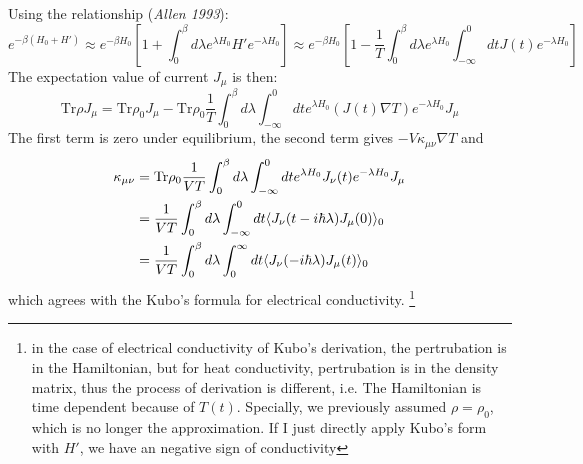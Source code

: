 \documentclass{article}
\begin{document}
Using the relationship (\emph{Allen 1993}):
\begin{equation}
    e^{-\beta (H_0 + H')} \approx e^{-\beta H_0} \left[ 1 + \int_0^{\beta} d\lambda e^{\lambda H_0} H' e^{-\lambda H_0} \right]
        \approx e^{-\beta H_0} \left[ 1 - \frac{1}{T} \int_0^{\beta} d\lambda e^{\lambda H_0} \int _{-\infty}^{0} dt J(t) e^{-\lambda H_0} \right]
\end{equation} 
The expectation value of current $J_{\mu}$ is then:
\begin{equation}
    \text{Tr}\rho J_{\mu} = \text{Tr}\rho_0 J_{\mu} - \text{Tr}\rho_0\frac{1}{T}\int_0^{\beta} d\lambda \int _{-\infty}^{0} dt 
    e^{\lambda H_0} (J(t) \nabla T) e^{-\lambda H_0} J_{\mu}
\end{equation}
The first term is zero under equilibrium, the second term gives $ - V \kappa_{\mu\nu} \nabla T$ and 
\begin{align}
    \kappa_{\mu\nu} & = \text{Tr}\rho_0 \frac{1}{VT} \int_0^{\beta} d\lambda \int _{-\infty}^{0} dt 
    e^{\lambda H_0} J_{\nu}(t) e^{-\lambda H_0} J_{\mu} \notag \\
    & = \frac{1}{VT}\int_0^{\beta} d\lambda \int _{-\infty}^{0} dt \langle J_{\nu}(t-i\hbar\lambda) J_{\mu}(0) \rangle_0 \notag \\
    & = \frac{1}{VT}\int_0^{\beta} d\lambda \int _{0}^{\infty} dt \langle J_{\nu}(-i\hbar\lambda) J_{\mu}(t) \rangle_0 
\end{align}
which agrees with the Kubo's formula for electrical conductivity. 
\footnote{in the case of electrical conductivity of Kubo's derivation, 
the pertrubation is in the Hamiltonian, but for heat conductivity, pertrubation 
is in the density matrix, thus the process of derivation is different, i.e. The
Hamiltonian is time dependent because of $T(t)$. Specially,
we previously assumed $\rho = \rho_{0}$, which is no longer the approximation. 
If I just directly apply Kubo's form with $H'$, we have an negative sign of conductivity }
\end{document}
